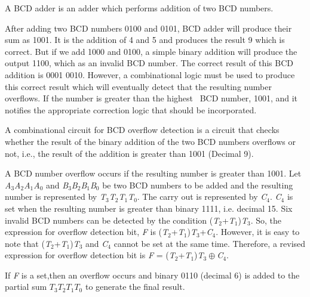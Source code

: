 \begin{property}\textnormal{
A BCD adder is an adder which performs addition of two BCD numbers.}
\end{property}

\begin{example}\textnormal{
After adding two BCD numbers 0100 and 0101, BCD adder will produce their sum as 1001. It is the addition of 4 and 5 and produces the result 9 which is correct. But if we add 1000 and 0100, a simple binary addition will produce the output 1100, which as an invalid BCD number. The correct result of this BCD addition is 0001 0010. However, a combinational logic must be used to produce this correct result which will eventually detect that the resulting number overflows. If the number is greater than the highest~ BCD number, 1001, and it notifies the appropriate correction logic that should be incorporated.}
\end{example}

\begin{property}\textnormal{
A combinational circuit for BCD overflow detection is a circuit that checks~ whether the result of the binary addition of the two BCD numbers overflows or not, i.e., the result of the addition is greater than 1001 (Decimal 9).}
\end{property}

A BCD number overflow occurs if the resulting number is greater than 1001. Let {\it A}${}_{3}${\it A}${}_{2}${\it A}${}_{1}${\it A}${}_{0}$ and {\it B}${}_{3}${\it B}${}_{2}${\it B}${}_{1}${\it B}${}_{0}$ be two BCD numbers to be added and the resulting number is represented by {\it T}${}_{3}${\it T}${}_{2}${\it T}${}_{1}${\it T}${}_{0}$. The carry out is represented by {\it C}${}_{4}$. {\it C}${}_{4}$ is set when the resulting number is greater than binary 1111, i.e. decimal 15. Six invalid BCD numbers can be detected by the condition ({\it T}${}_{2}$+{\it T}${}_{1}$){\it T}${}_{3}$. So, the expression for overflow detection bit, {\it F }is ({\it T}${}_{2}$+{\it T}${}_{1}$){\it T}${}_{3}$+{\it C}${}_{4}$. However, it is easy to note that ({\it T}${}_{2}$+{\it T}${}_{1}$){\it T}${}_{3}$ and {\it C}${}_{4}$ cannot be set at the same time. Therefore, a revised expression for overflow detection bit is {\it F }= ({\it T}${}_{2}$+{\it T}${}_{1}$){\it T}${}_{3}\oplus${\it C}${}_{4}$.

If {\it F} is a set,then an overflow occurs and binary 0110 (decimal 6) is added to the partial sum $T{}_{3}T{}_{2}T{}_{1}T{}_{0}$ to generate the final result.

